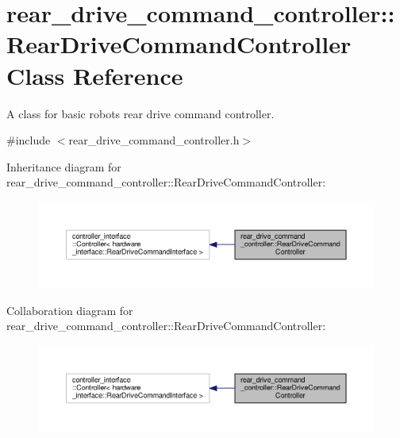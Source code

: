 \hypertarget{classrear__drive__command__controller_1_1RearDriveCommandController}{}\section{rear\+\_\+drive\+\_\+command\+\_\+controller\+:\+:Rear\+Drive\+Command\+Controller Class Reference}
\label{classrear__drive__command__controller_1_1RearDriveCommandController}


A class for basic robot\textquotesingle{}s rear drive command controller.  




{\ttfamily \#include $<$rear\+\_\+drive\+\_\+command\+\_\+controller.\+h$>$}



Inheritance diagram for rear\+\_\+drive\+\_\+command\+\_\+controller\+:\+:Rear\+Drive\+Command\+Controller\+:\nopagebreak
\begin{figure}[H]
\begin{center}
\leavevmode
\includegraphics[width=350pt]{classrear__drive__command__controller_1_1RearDriveCommandController__inherit__graph}
\end{center}
\end{figure}


Collaboration diagram for rear\+\_\+drive\+\_\+command\+\_\+controller\+:\+:Rear\+Drive\+Command\+Controller\+:\nopagebreak
\begin{figure}[H]
\begin{center}
\leavevmode
\includegraphics[width=350pt]{classrear__drive__command__controller_1_1RearDriveCommandController__coll__graph}
\end{center}
\end{figure}
